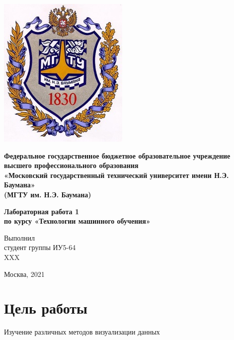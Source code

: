\documentclass[a4paper]{article}
\begin{document}
  \fontsize{14}{16}\selectfont

  \begin{titlepage}
    \begin{minipage}{0.2\textwidth}
      \includegraphics[scale=0.4]{logo}
    \end{minipage}
    \begin{minipage}{0.7\textwidth}\centering
      \fontsize{10}{12}\selectfont
      \textbf{
        Федеральное государственное бюджетное образовательное учреждение \\
        высшего профессионального образования \\
        «Московский государственный технический университет имени Н.Э. Баумана» \\
        (МГТУ им. Н.Э. Баумана)
      }
    \end{minipage}

    \vspace{5cm}
    \centering
    \textbf{
      Лабораторная работа 1 \\
      по курсу «Технологии машинного обучения» \\
    }

    \vspace{5cm}
    \begin{flushright}
    Выполнил \\
    студент группы ИУ5-64 \\
    XXX
    \end{flushright}
    \vspace*{\fill}
    Москва, 2021
  \end{titlepage}

  \section*{Цель работы}
  Изучение различных методов визуализации данных
\end{document}
